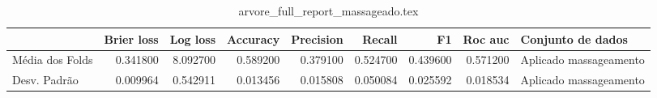 \begin{table}
\centering
\caption{arvore_full_report_massageado.tex}
\label{arvore_full_report_massageado.tex}
\begin{tabular}{lrrrrrrrl}
\toprule
{} &  Brier  loss &  Log loss &  Accuracy  &  Precision  &   Recall  &       F1  &  Roc auc  &       Conjunto de dados \\
\midrule
Média dos Folds &     0.341800 &  8.092700 &   0.589200 &    0.379100 &  0.524700 &  0.439600 &  0.571200 &  Aplicado massageamento \\
Desv. Padrão    &     0.009964 &  0.542911 &   0.013456 &    0.015808 &  0.050084 &  0.025592 &  0.018534 &  Aplicado massageamento \\
\bottomrule
\end{tabular}
\end{table}
